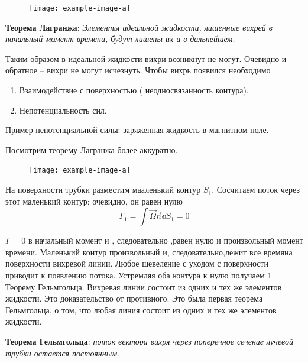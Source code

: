 \begin{figure}[h!]
    \centering
    \texttt{[image: example-image-a]}
    \caption{}
    \label{fig:figure1}
\end{figure}

\textbf{Теорема Лагранжа}: \textit{Элементы идеальной жидкости, лишенные вихрей в начальный момент
	времени, будут лишены их и в дальнейшем.}

Таким образом в идеальной жидкости вихри возникнут не могут.
Очевидно и обратное – вихри не могут исчезнуть.
Чтобы вихрь появился необходимо
\begin{enumerate}
	\item Взаимодействие с поверхностью ( неодносвязанность контура).
	\item Непотенциальность сил.
\end{enumerate}
Пример непотенциальной силы: заряженная жидкость в магнитном поле.

Посмотрим теорему Лагранжа более аккуратно. 

\begin{figure}[h!]
    \centering
    \texttt{[image: example-image-a]}
    \caption{}
    \label{fig:figure1}
\end{figure}

На поверхности трубки разместим мааленький контур $S_1$. Сосчитаем поток через этот маленький контур: очевидно, он равен нулю 
\begin{equation}
	\Gamma_1=\int \vec\Omega \vec{n}\dd S_1 = 0
\end{equation}

$\Gamma =0$ в начальный момент и , следовательно ,равен нулю и произвольный
момент времени. Маленький контур произвольный и, следовательно,лежит все времяна поверхности вихревой линии. Любое шевеление с уходом с поверхности приводит к появлению потока.
Устремляя оба контура к нулю получаем 1 Теорему Гельмгольца.
Вихревая линии состоит из одних и тех же элементов жидкости. Это доказательство от противного. Это была первая теорема Гельмгольца, о том, что любая линия состоит из одних и тех же элементов жидкости.

\textbf{Теорема Гельмгольца}: \textit{поток вектора вихря через поперечное сечение лучевой трубки остается постоянным}. 

